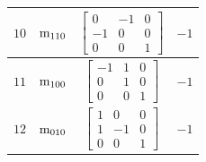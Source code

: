 \documentclass[fleqn,8pt]{jsarticle}
\begin{document}
\begin{longtable}{cccc}
$ 10 $ & $ {\rm m}_{110} $ & $ \begin{bmatrix} 0 & -1 & 0 \\ -1 & 0 & 0 \\ 0 & 0 & 1 \end{bmatrix} $ & $ -1 $ \\ \hline
$ 11 $ & $ {\rm m}_{100} $ & $ \begin{bmatrix} -1 & 1 & 0 \\ 0 & 1 & 0 \\ 0 & 0 & 1 \end{bmatrix} $ & $ -1 $ \\ \hline
$ 12 $ & $ {\rm m}_{010} $ & $ \begin{bmatrix} 1 & 0 & 0 \\ 1 & -1 & 0 \\ 0 & 0 & 1 \end{bmatrix} $ & $ -1 $ \\
\end{longtable}
\end{document}
